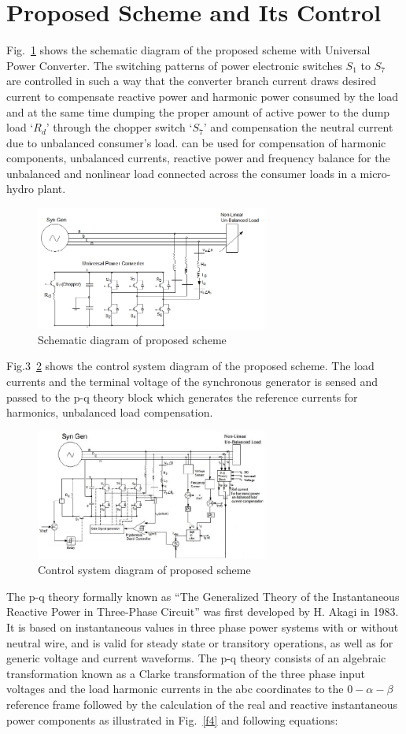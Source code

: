 \documentclass[journal,twoside]{IEEEtran}
\begin{document}
	\section{Proposed Scheme and Its Control}
Fig.~\ref{f2} shows the schematic diagram of the proposed scheme
with Universal Power Converter. The switching patterns of
power electronic switches $S_1$ to $S_7$ are controlled in such a way
that the converter branch current draws desired current to
compensate reactive power and harmonic power consumed by
the load and at the same time dumping the proper amount of active power to the dump load $‘R_d ’$ through the chopper switch
$‘S_7 ’$ and compensation the neutral current due to unbalanced
consumer’s load. can be used for compensation of harmonic
components, unbalanced currents, reactive power and
frequency balance for the unbalanced and nonlinear load
connected across the consumer loads in a micro-hydro plant.
\begin{figure}[!ht]
\centering
\includegraphics[width=3in]{2}
\caption{Schematic diagram of proposed scheme}
\label{f2}
\end{figure}

\bigskip
Fig.3~\ref{f3} shows the control system diagram of the proposed
scheme. The load currents and the terminal voltage of the
synchronous generator is sensed and passed to the p-q theory
block which generates the reference currents for harmonics,
unbalanced load compensation.
\begin{figure}[!ht]
\centering
\includegraphics[width=3in]{3}
\caption{Control system diagram of proposed scheme}
\label{f3}
\end{figure}


\bigskip
The p-q theory formally known as “The Generalized Theory of
the Instantaneous Reactive Power in Three-Phase Circuit” was
first developed by H. Akagi in 1983. It is based on
instantaneous values in three phase power systems with or
without neutral wire, and is valid for steady state or transitory
operations, as well as for generic voltage and current
waveforms. The p-q theory consists of an algebraic
transformation known as a Clarke transformation of the three
phase input voltages and the load harmonic currents in the abc
coordinates to the $0-\alpha -\beta$ reference frame followed by the
calculation of the real and reactive instantaneous power
components as illustrated in Fig.~\ref{f4} and following equations:
\end{document}
